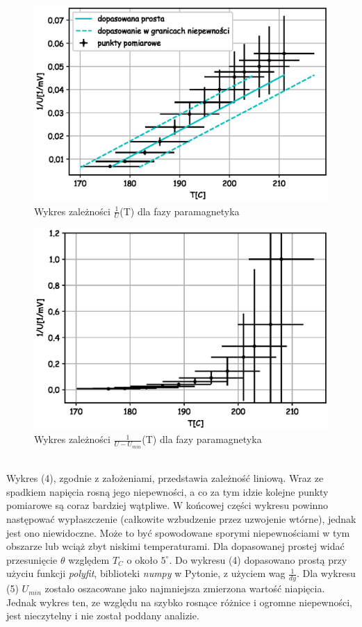 \documentclass[a4paper,10pt]{article}
\begin{document}
\begin{figure}[H]
  \includegraphics{./Curie_odwrotnosc.eps}
  \caption{Wykres zależności $\frac{1}{U}$(T) dla fazy paramagnetyka}
\end{figure}
\begin{figure}[H]
  \includegraphics{./Curie_odjete.eps}
  \caption{Wykres zależności $\frac{1}{U-U_{min}}$(T) dla fazy paramagnetyka}
\end{figure}
\\Wykres (4), zgodnie z założeniami, przedstawia zależność liniową. Wraz ze spadkiem napięcia rosną jego niepewności, a co za tym idzie kolejne punkty pomiarowe są coraz bardziej wątpliwe. W końcowej części wykresu powinno następować wypłaszczenie (całkowite wzbudzenie przez uzwojenie wtórne), jednak jest ono niewidoczne. Może to być spowodowane sporymi niepewnościami w tym obszarze lub wciąż zbyt niskimi temperaturami. Dla dopasowanej prostej widać przesunięcie $\theta$ względem $T_C$ o około $5^\circ$. Do wykresu (4) dopasowano prostą przy użyciu funkcji \emph{polyfit}, biblioteki \emph{numpy} w Pytonie, z użyciem wag $\frac{1}{dy}$. Dla wykresu (5) $U_{min}$ zostało oszacowane jako najmniejsza zmierzona wartość niapięcia. Jednak wykres ten, ze względu na szybko rosnące różnice i ogromne niepewności, jest nieczytelny i nie został poddany analizie.
\\
\end{document}
